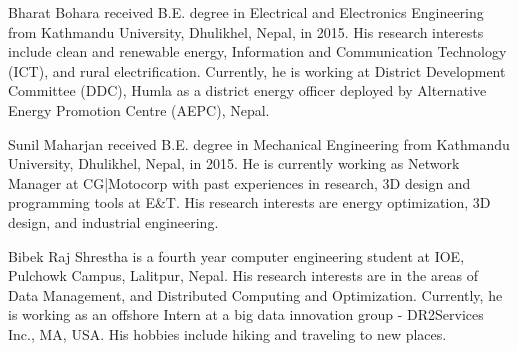 \documentclass[journal,twoside]{IEEEtran}
\begin{document}
\newpage
\begin{IEEEbiography}{Bharat Bohara}
    received B.E. degree in Electrical and Electronics Engineering from Kathmandu University, Dhulikhel, Nepal, in 2015. His research interests include clean and renewable energy, Information and Communication Technology (ICT), and rural electrification. Currently, he is working at District Development Committee (DDC), Humla as a district energy officer deployed by Alternative Energy Promotion Centre (AEPC), Nepal.
\end{IEEEbiography}
\vspace{-12cm}
\begin{IEEEbiography}{Sunil Maharjan}
    received B.E. degree in Mechanical Engineering from Kathmandu University, Dhulikhel, Nepal, in 2015. He is currently working as Network Manager at CG|Motocorp with past experiences in research, 3D design and programming tools at E\&T. His research interests are energy optimization, 3D design, and industrial engineering.
\end{IEEEbiography}
\vspace{-12cm}
\begin{IEEEbiography}{Bibek Raj Shrestha}
    is a fourth year computer engineering student at IOE, Pulchowk Campus, Lalitpur, Nepal. His research interests are in the areas of Data Management, and Distributed Computing and Optimization. Currently, he is working as an offshore Intern at a big data innovation group - DR2Services Inc., MA, USA. His hobbies include hiking and traveling to new places.
\end{IEEEbiography}


\end{document}
